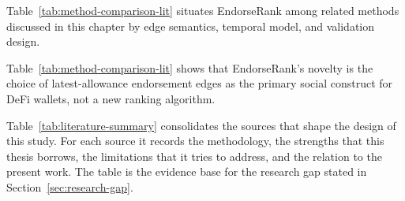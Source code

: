 
Table~\ref{tab:method-comparison-lit} situates EndorseRank among related methods discussed in this chapter by edge semantics, temporal model, and validation design.

\begin{table}[htbp]
\centering
\caption{Comparison of selected graph reputation methods (conceptual).}
\label{tab:method-comparison-lit}
\end{table}

Table~\ref{tab:method-comparison-lit} shows that EndorseRank's novelty is the choice of latest-allowance endorsement edges as the primary social construct for DeFi wallets, not a new ranking algorithm.


Table~\ref{tab:literature-summary} consolidates the sources that shape the design of this study. For each source it records the methodology, the strengths that this thesis borrows, the limitations that it tries to address, and the relation to the present work. The table is the evidence base for the research gap stated in Section~\ref{sec:research-gap}.

